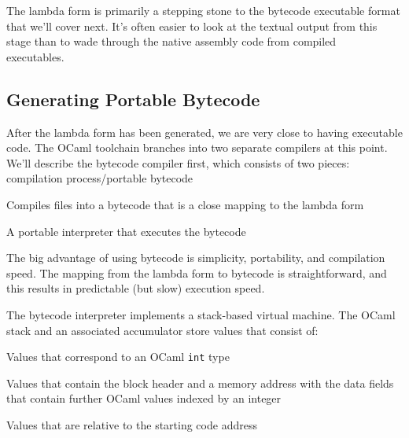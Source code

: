 The lambda form is primarily a stepping stone to the bytecode executable
format that we'll cover next. It's often easier to look at the textual
output from this stage than to wade through the native assembly code
from compiled executables.~

\hypertarget{generating-portable-bytecode}{%
\subsection{Generating Portable
Bytecode}\label{generating-portable-bytecode}}

After the lambda form has been generated, we are very close to having
executable code. The OCaml toolchain branches into two separate
compilers at this point. We'll describe the bytecode compiler first,
which consists of two pieces:
\protect\hypertarget{CPportbyte}{}{compilation
process/portable bytecode}

\begin{description}
\tightlist
\item[\texttt{ocamlc}]
Compiles files into a bytecode that is a close mapping to the lambda
form
\item[\texttt{ocamlrun}]
A portable interpreter that executes the bytecode
\end{description}

The big advantage of using bytecode is simplicity, portability, and
compilation speed. The mapping from the lambda form to bytecode is
straightforward, and this results in predictable (but slow) execution
speed.

The bytecode interpreter implements a stack-based virtual machine. The
OCaml stack and an associated accumulator store values that consist
of:

\begin{description}
\tightlist
\item[long]
Values that correspond to an OCaml \passthrough{\lstinline!int!} type
\item[block]
Values that contain the block header and a memory address with the data
fields that contain further OCaml values indexed by an integer
\item[code offset]
Values that are relative to the starting code address
\end{description}

